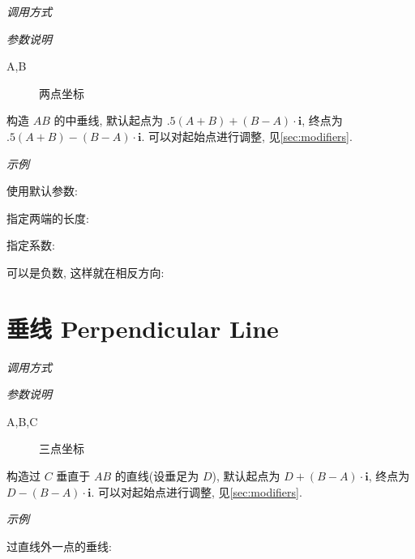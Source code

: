 \emph{调用方式}

\begin{tcolorbox}{}
\end{tcolorbox}

\emph{参数说明}

\begin{description}
  \item[A,B] 两点坐标 
\end{description}

构造 $AB$ 的中垂线, 默认起点为 $.5(A+B)+(B-A) \cdot \mathbf{i}$, 终点为 $.5(A+B)-(B-A) \cdot \mathbf{i}$.
可以对起始点进行调整, 见\ref{sec:modifiers}.

\emph{示例}

使用默认参数:


指定两端的长度:


指定系数:


可以是负数, 这样就在相反方向:


\section{垂线 Perpendicular Line}

\emph{调用方式}

\begin{tcolorbox}{}
\end{tcolorbox}

\emph{参数说明}

\begin{description}
  \item[A,B,C] 三点坐标 
\end{description}

构造过 $C$ 垂直于 $AB$ 的直线(设垂足为 $D$), 默认起点为 $D+(B-A) \cdot \mathbf{i}$, 终点为 $D-(B-A) \cdot \mathbf{i}$.
可以对起始点进行调整, 见\ref{sec:modifiers}.

\emph{示例}

过直线外一点的垂线:



